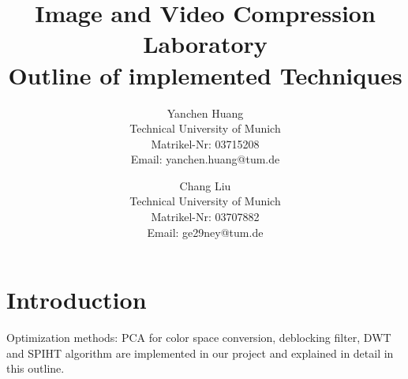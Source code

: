 \documentclass[twocolumn]{article}  %
\title{Image and Video Compression Laboratory\\Outline of implemented Techniques} %
\author{
\scriptsize Yanchen Huang\\[1ex] 
\scriptsize Technical University of Munich\\ %
\scriptsize Matrikel-Nr: 03715208\\ %
\scriptsize {Email: yanchen.huang@tum.de}\\ %
\and %
\scriptsize Chang Liu\\[1ex] 
\scriptsize Technical University of Munich\\ %
\scriptsize Matrikel-Nr: 03707882\\ %
\scriptsize {Email: ge29ney@tum.de}\\ 
}
\date{}
\begin{document}
\small
\maketitle


\section{Introduction}
Optimization methods: PCA for color space conversion, deblocking filter, DWT and SPIHT algorithm are implemented in our project and explained in detail in this outline. 
\end{document}
